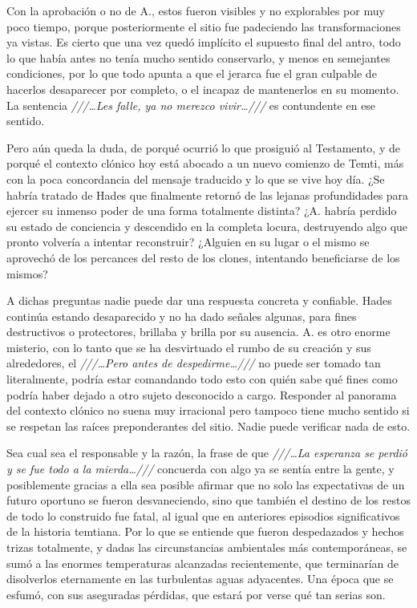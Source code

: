 \documentclass[
  spanish,
]{book}
\begin{document}
Con la aprobación o no de A., estos fueron visibles y no explorables por muy poco tiempo, porque posteriormente el sitio fue padeciendo las transformaciones ya vistas. Es cierto que una vez quedó implícito el supuesto final del antro, todo lo que había antes no tenía mucho sentido conservarlo, y menos en semejantes condiciones, por lo que todo apunta a que el jerarca fue el gran culpable de hacerlos desaparecer por completo, o el incapaz de mantenerlos en su momento. La sentencia \emph{///\ldots Les falle, ya no merezco vivir\ldots///} es contundente en ese sentido.

Pero aún queda la duda, de porqué ocurrió lo que prosiguió al Testamento, y de porqué el contexto clónico hoy está abocado a un nuevo comienzo de Temti, más con la poca concordancia del mensaje traducido y lo que se vive hoy día. ¿Se habría tratado de Hades que finalmente retornó de las lejanas profundidades para ejercer su inmenso poder de una forma totalmente distinta? ¿A. habría perdido su estado de conciencia y descendido en la completa locura, destruyendo algo que pronto volvería a intentar reconstruir? ¿Alguien en su lugar o el mismo se aprovechó de los percances del resto de los clones, intentando beneficiarse de los mismos?

A dichas preguntas nadie puede dar una respuesta concreta y confiable. Hades continúa estando desaparecido y no ha dado señales algunas, para fines destructivos o protectores, brillaba y brilla por su ausencia. A. es otro enorme misterio, con lo tanto que se ha desvirtuado el rumbo de su creación y sus alrededores, el \emph{///\ldots Pero antes de despedirme\ldots///} no puede ser tomado tan literalmente, podría estar comandando todo esto con quién sabe qué fines como podría haber dejado a otro sujeto desconocido a cargo. Responder al panorama del contexto clónico no suena muy irracional pero tampoco tiene mucho sentido si se respetan las raíces preponderantes del sitio. Nadie puede verificar nada de esto.

Sea cual sea el responsable y la razón, la frase de que \emph{///\ldots La esperanza se perdió y se fue todo a la mierda\ldots///} concuerda con algo ya se sentía entre la gente, y posiblemente gracias a ella sea posible afirmar que no solo las expectativas de un futuro oportuno se fueron desvaneciendo, sino que también el destino de los restos de todo lo construido fue fatal, al igual que en anteriores episodios significativos de la historia temtiana. Por lo que se entiende que fueron despedazados y hechos trizas totalmente, y dadas las circunstancias ambientales más contemporáneas, se sumó a las enormes temperaturas alcanzadas recientemente, que terminarían de disolverlos eternamente en las turbulentas aguas adyacentes. Una época que se esfumó, con sus aseguradas pérdidas, que estará por verse qué tan serias son.
\end{document}
